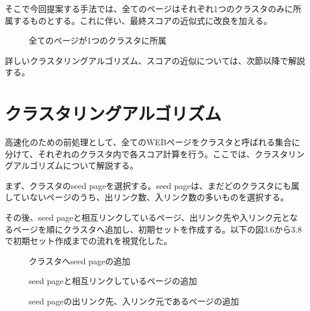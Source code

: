 \documentclass[a4paper,11pt]{jreport}
\begin{document}
そこで今回提案する手法では、全てのページはそれぞれ1つのクラスタのみに所属するものとする。これに伴い、最終スコアの近似式に改良を加える。

\begin{figure}[htbp]
\begin{center}
\end{center}
\caption{全てのページが1つのクラスタに所属}
\label{figure:sample}
\end{figure}

詳しいクラスタリングアルゴリズム、スコアの近似については、次節以降で解説する。

\section{クラスタリングアルゴリズム}

高速化のための前処理として、全てのWEBページをクラスタと呼ばれる集合に分けて、それぞれのクラスタ内で各スコア計算を行う。ここでは、クラスタリングアルゴリズムについて解説する。

まず、クラスタのseed pageを選択する。seed pageは、まだどのクラスタにも属していないページのうち、出リンク数、入リンク数の多いものを選択する。

その後、seed pageと相互リンクしているページ、出リンク先や入リンク元となるページを順にクラスタへ追加し、初期セットを作成する。以下の図3.6から3.8で初期セット作成までの流れを視覚化した。

\begin{figure}[htbp]
\begin{center}
\end{center}
\caption{クラスタへseed pageの追加}
\label{figure:sample}
\end{figure}

\begin{figure}[htbp]
\begin{center}
\end{center}
\caption{seed pageと相互リンクしているページの追加}
\label{figure:sample}
\end{figure}

\begin{figure}[htbp]
\begin{center}
\end{center}
\caption{seed pageの出リンク先、入リンク元であるページの追加}
\label{figure:sample}
\end{figure}
\end{document}
